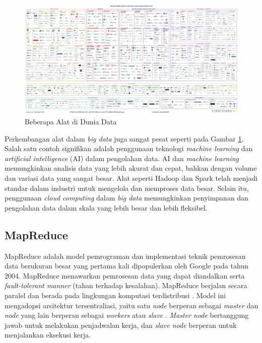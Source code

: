 \begin{figure}[h!]
    \centering
    \includegraphics[width=1\textwidth]{figures/ch02/data-stack.jpg}
    \caption{Beberapa Alat di Dunia Data \cite{RedHot20212021}}
    \label{fig:data-stacks}
\end{figure}

Perkembangan alat dalam \textit{big data} juga sangat pesat seperti pada Gambar \ref{fig:data-stacks}. Salah satu contoh signifikan adalah penggunaan teknologi \textit{machine learning} dan \textit{artificial intelligence} (AI) dalam pengolahan data. AI dan \textit{machine learning} memungkinkan analisis data yang lebih akurat dan cepat, bahkan dengan volume dan variasi data yang sangat besar. Alat seperti Hadoop dan Spark telah menjadi standar dalam industri untuk mengelola dan memproses data besar. Selain itu, penggunaan \textit{cloud computing} dalam \textit{big data} memungkinkan penyimpanan dan pengolahan data dalam skala yang lebih besar dan lebih fleksibel.

\subsection{MapReduce}
MapReduce adalah model pemrograman dan implementasi teknik pemrosesan data berukuran besar yang pertama kali dipopulerkan oleh Google pada tahun 2004\cite{kaliaAnalysisHadoopMapReduce2021}. MapReduce menawarkan pemrosesan data yang dapat diandalkan serta \textit{fault-tolerant manner} (tahan terhadap kesalahan).  MapReduce berjalan secara paralel dan berada pada lingkungan komputasi terdistribusi \cite{cTaskFailureResilience2020}. Model ini mengadopsi arsitektur tersentraliasi, yaitu satu \textit{node} berperan sebagai \textit{master} dan \textit{node} yang lain berperan sebagai \textit{workers} atau \textit{slave} \cite{herodotouHadoopPerformanceModels2011, bakratsasHadoopMapReducePerformance2018}. \textit{Master node} bertanggung jawab untuk melakukan penjadwalan kerja, dan \textit{slave node} berperan untuk menjalankan eksekusi kerja. 

